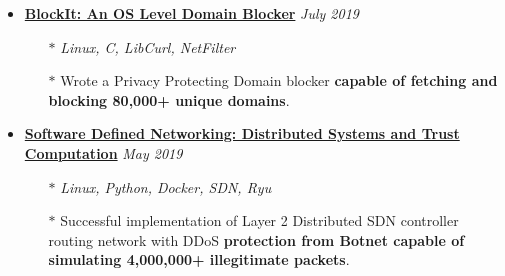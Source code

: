 \documentclass[10pt,a4paper]{article}
\begin{document}
\begin{itemize}[noitemsep,nolistsep]
		\item{\textbf{\href{https://gitlab.com/r0ck3r008/blockit}{BlockIt: An OS Level Domain Blocker}} \hfill \textit{July 2019}}
			\begin{itemize}[leftmargin=*]
				\setlength\itemsep{-0.25em}
				\item[$\ast$]{\textit{Linux, C, LibCurl, NetFilter}}
				\item[$\ast$]{Wrote a Privacy Protecting Domain blocker \textbf{capable of fetching and blocking 80,000+ unique domains}.}
			\end{itemize}

		\item{\textbf{\href{https://gitlab.com/r0ck3r008/sdn-proj}{Software Defined Networking: Distributed Systems and Trust Computation}} \hfill \textit{May 2019}}
			\begin{itemize}[leftmargin=*]
				\setlength\itemsep{-0.25em}
				\item[$\ast$]{\textit{Linux, Python, Docker, SDN, Ryu}}
				\item[$\ast$]{Successful implementation of Layer 2 Distributed SDN controller routing network with DDoS \textbf{protection from Botnet capable of simulating 4,000,000+ illegitimate packets}.}
			\end{itemize}

	\end{itemize}
\end{document}

